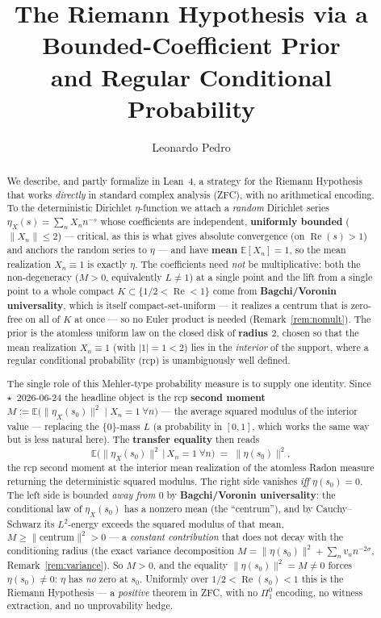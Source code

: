 \documentclass[11pt,a4paper]{article}
\title{The Riemann Hypothesis via a Bounded-Coefficient Prior\\and Regular Conditional Probability}
\author{Leonardo Pedro}
\date{}
\theoremstyle{definition}
\newcommand{\Rea}{\operatorname{Re}}
\newcommand{\etaX}{\eta_X}
\begin{document}
\maketitle

\begin{abstract}
We describe, and partly formalize in Lean~4, a strategy for the Riemann Hypothesis
that works \emph{directly} in standard complex analysis (ZFC), with no arithmetical
encoding. To the deterministic Dirichlet \(\eta\)-function we attach a \emph{random}
Dirichlet series \(\etaX(s)=\sum_n X_n n^{-s}\) whose coefficients are independent,
\textbf{uniformly bounded} (\(\|X_n\|\le 2\)) --- critical, as this is what gives absolute
convergence (on \(\Rea(s)>1\)) and anchors the random series to \(\eta\) --- and have
\textbf{mean} \(\mathbb{E}[X_n]=1\), so the mean realization \(X_n\equiv1\) is exactly
\(\eta\). The coefficients need \emph{not} be multiplicative: both the non-degeneracy
(\(M>0\), equivalently \(L\neq1\)) at a single point and the lift from a single point to a whole compact
\(K\subset\{1/2<\Rea<1\}\) come from \textbf{Bagchi/Voronin universality}, which is itself
compact-set-uniform --- it realizes a centrum that is zero-free on all of \(K\) at once --- so
no Euler product is needed (Remark~\ref{rem:nomult}). The prior is the atomless uniform law on
the closed disk of \textbf{radius \(2\)}, chosen so that the mean realization \(X_n\equiv1\)
(with \(|1|=1<2\)) lies in the \emph{interior} of the support, where a regular conditional
probability (rcp) is unambiguously well defined.

The single role of this Mehler-type probability measure is to supply one identity. Since
\(\star\)~2026-06-24 the headline object is the rcp \textbf{second moment}
\(M:=\mathbb{E}\bigl(\|\etaX(s_0)\|^2 \mid X_n=1\ \forall n\bigr)\) --- the average squared
modulus of the interior value --- replacing the \(\{0\}\)-mass \(L\) (a probability in
\([0,1]\), which works the same way but is less natural here). The \textbf{transfer
equality} then reads
\[
  \mathbb{E}\bigl(\|\etaX(s_0)\|^2 \,\big|\, X_n=1\ \forall n\bigr)
  \;=\;
  \|\eta(s_0)\|^2 ,
\]
the rcp second moment at the interior mean realization of the atomless Radon measure
returning the deterministic squared modulus. The right side vanishes \emph{iff}
\(\eta(s_0)=0\). The left side is bounded \emph{away from \(0\)} by \textbf{Bagchi/Voronin
universality}: the conditional law of \(\etaX(s_0)\) has a nonzero mean (the ``centrum''),
and by Cauchy--Schwarz its \(L^2\)-energy exceeds the squared modulus of that mean,
\(M\ge\|\text{centrum}\|^2>0\) --- a \emph{constant contribution} that does not decay with the
conditioning radius (the exact variance decomposition
\(M=\|\eta(s_0)\|^2+\sum_n v_n n^{-2\sigma}\), Remark~\ref{rem:variance}). So \(M>0\), and the
equality \(\|\eta(s_0)\|^2=M\neq0\) forces \(\eta(s_0)\neq0\): \(\eta\) has \emph{no} zero at
\(s_0\). Uniformly over \(1/2<\Rea(s_0)<1\) this is the Riemann Hypothesis --- a \emph{positive}
theorem in ZFC, with no \(\Pi^0_1\) encoding, no witness extraction, and no unprovability hedge.


\end{abstract}
\end{document}
